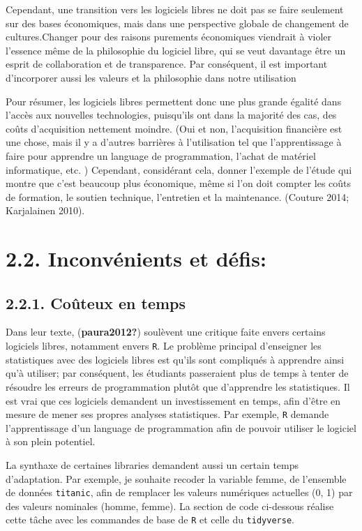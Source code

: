 \documentclass[
  letterpaper,
]{scrbook}
\begin{document}
Cependant, une transition vers les logiciels libres ne doit pas se faire
seulement sur des bases économiques, mais dans une perspective globale
de changement de cultures.Changer pour des raisons purements économiques
viendrait à violer l'essence même de la philosophie du logiciel libre,
qui se veut davantage être un esprit de collaboration et de
transparence. Par conséquent, il est important d'incorporer aussi les
valeurs et la philosophie dans notre utilisation

Pour résumer, les logiciels libres permettent donc une plus grande
égalité dans l'accès aux nouvelles technologies, puisqu'ils ont dans la
majorité des cas, des coûts d'acquisition nettement moindre. (Oui et
non, l'acquisition financière est une chose, mais il y a d'autres
barrières à l'utilisation tel que l'apprentissage à faire pour apprendre
un language de programmation, l'achat de matériel informatique, etc. )
Cependant, considérant cela, donner l'exemple de l'étude qui montre que
c'est beaucoup plus économique, même si l'on doit compter les coûts de
formation, le soutien technique, l'entretien et la maintenance. (Couture
2014; Karjalainen 2010).

\hypertarget{inconvuxe9nients-et-duxe9fis}{%
\section{2.2. Inconvénients et
défis:}\label{inconvuxe9nients-et-duxe9fis}}

\hypertarget{couxfbteux-en-temps}{%
\subsection{2.2.1. Coûteux en temps}\label{couxfbteux-en-temps}}

Dans leur texte, (\textbf{paura2012?}) soulèvent une critique faite
envers certains logiciels libres, notamment envers \texttt{R}. Le
problème principal d'enseigner les statistiques avec des logiciels
libres est qu'ils sont compliqués à apprendre ainsi qu'à utiliser; par
conséquent, les étudiants passeraient plus de temps à tenter de résoudre
les erreurs de programmation plutôt que d'apprendre les statistiques. Il
est vrai que ces logiciels demandent un investissement en temps, afin
d'être en mesure de mener ses propres analyses statistiques. Par
exemple, \texttt{R} demande l'apprentissage d'un language de
programmation afin de pouvoir utiliser le logiciel à son plein
potentiel.

La synthaxe de certaines libraries demandent aussi un certain temps
d'adaptation. Par exemple, je souhaite recoder la variable femme, de
l'ensemble de données \texttt{titanic}, afin de remplacer les valeurs
numériques actuelles (0, 1) par des valeurs nominales (homme, femme). La
section de code ci-dessous réalise cette tâche avec les commandes de
base de \texttt{R} et celle du \texttt{tidyverse}.
\end{document}
